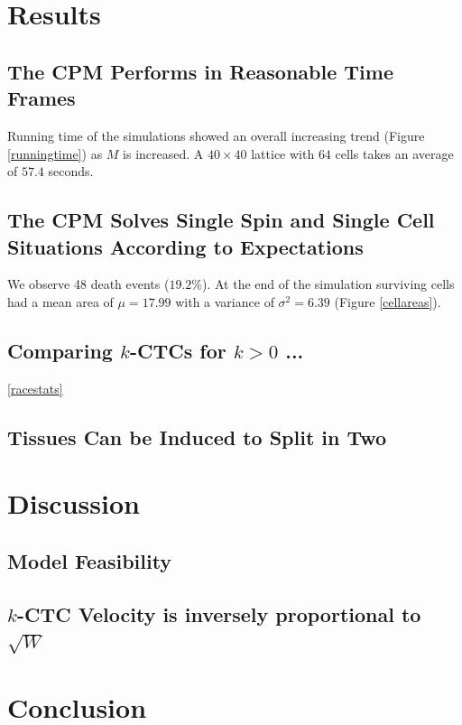 \documentclass[12pt]{article}
\begin{document}
\section{Results}
\subsection{The CPM Performs in Reasonable Time Frames}
Running time of the simulations showed an overall increasing trend (Figure \ref{runningtime}) as $M$ is increased. A $40\times40$ lattice with $64$ cells takes an average of $57.4$ seconds. 

\subsection{The CPM Solves Single Spin and Single Cell Situations According to Expectations }
We observe 48 death events ($19.2\%$). At the end of the simulation surviving cells had a mean area of $\mu = 17.99$ with a variance of $\sigma^2 = 6.39$ (Figure \ref{cellareas}). %

\subsection{Comparing $k$-CTCs for $k>0$ ...} %
\ref{racestats}

\subsection{Tissues Can be Induced to Split in Two}

\section{Discussion}

\subsection{Model Feasibility}

\subsection{$k$-CTC Velocity is inversely proportional to $\sqrt{W}$ }

\section{Conclusion}
\end{document}
